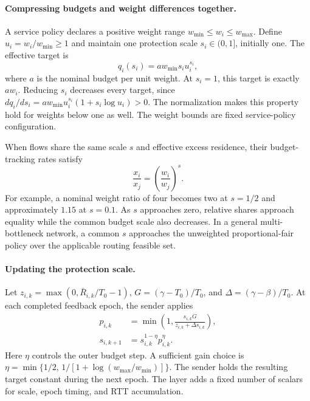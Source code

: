 \paragraph{Compressing budgets and weight differences together.}
A service policy declares a positive weight range
$w_{\min}\le w_i\le w_{\max}$. Define $u_i=w_i/w_{\min}\ge1$ and maintain
one protection scale $s_i\in(0,1]$, initially one. The effective target is
\begin{equation}
 q_i(s_i)=a w_{\min}s_i u_i^{s_i},
 \label{eq:protected-budget}
\end{equation}
where $a$ is the nominal budget per unit weight. At $s_i=1$, this target is
exactly $a w_i$. Reducing $s_i$ decreases every target, since
$dq_i/ds_i=a w_{\min}u_i^{s_i}(1+s_i\log u_i)>0$.
The normalization makes this property hold for weights below one as well.
The weight bounds are fixed service-policy configuration.

When flows share the same scale $s$ and effective excess residence, their
budget-tracking rates satisfy
\begin{equation}
 \frac{x_i}{x_j}=\left(\frac{w_i}{w_j}\right)^s.
 \label{eq:protected-share-ratio}
\end{equation}
For example, a nominal weight ratio of four becomes two at $s=1/2$ and
approximately $1.15$ at $s=0.1$. As $s$ approaches zero, relative shares
approach equality while the common budget scale also decreases. In a general
multi-bottleneck network, a common $s$ approaches the unweighted
proportional-fair policy over the applicable routing feasible set.

\paragraph{Updating the protection scale.}
Let $z_{i,k}=\max(0,\bar R_{i,k}/T_0-1)$,
$G=(\gamma-T_0)/T_0$, and $\Delta=(\gamma-\beta)/T_0$.
At each completed feedback epoch, the sender applies
\begin{align}
 p_{i,k}&=\min\left(1,
       \frac{s_{i,k}G}{z_{i,k}+\Delta s_{i,k}}\right),
       \label{eq:protection-proposal}\\
 s_{i,k+1}&=s_{i,k}^{1-\eta}p_{i,k}^{\eta}.
       \label{eq:protection-update}
\end{align}
Here $\eta$ controls the outer budget step. A sufficient gain choice is
$\eta=\min\{1/2,\,1/[1+\log(w_{\max}/w_{\min})]\}$.
The sender holds the resulting target constant during the next epoch.
The layer adds a fixed number of scalars for scale, epoch timing, and RTT
accumulation.

